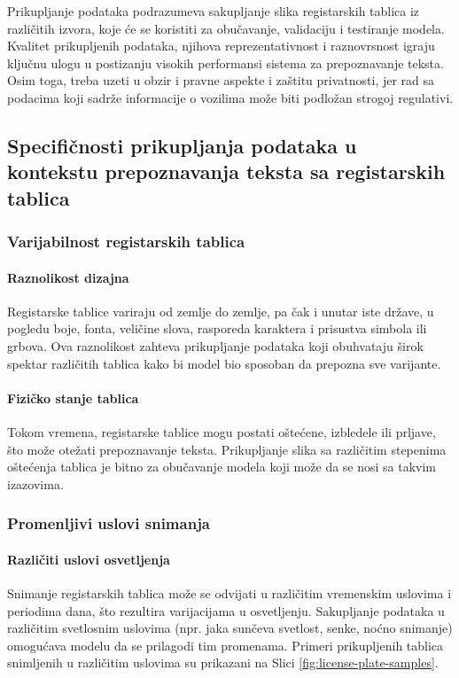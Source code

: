 \documentclass[a4paper,12pt]{article}
\begin{document}
	Prikupljanje podataka podrazumeva sakupljanje slika registarskih tablica iz različitih izvora, koje će se koristiti za obučavanje, validaciju i testiranje modela. Kvalitet prikupljenih podataka, njihova reprezentativnost i raznovrsnost igraju ključnu ulogu u postizanju visokih performansi sistema za prepoznavanje teksta. Osim toga, treba uzeti u obzir i pravne aspekte i zaštitu privatnosti, jer rad sa podacima koji sadrže informacije o vozilima može biti podložan strogoj regulativi.
	
	\subsection{Specifičnosti prikupljanja podataka u kontekstu prepoznavanja teksta sa registarskih tablica}
	
	\subsubsection{Varijabilnost registarskih tablica}
	\paragraph{Raznolikost dizajna}
	Registarske tablice variraju od zemlje do zemlje, pa čak i unutar iste države, u pogledu boje, fonta, veličine slova, rasporeda karaktera i prisustva simbola ili grbova. Ova raznolikost zahteva prikupljanje podataka koji obuhvataju širok spektar različitih tablica kako bi model bio sposoban da prepozna sve varijante.
	
	\paragraph{Fizičko stanje tablica}
	Tokom vremena, registarske tablice mogu postati oštećene, izbledele ili prljave, što može otežati prepoznavanje teksta. Prikupljanje slika sa različitim stepenima oštećenja tablica je bitno za obučavanje modela koji može da se nosi sa takvim izazovima.
	
	\subsubsection{Promenljivi uslovi snimanja}
	\paragraph{Različiti uslovi osvetljenja}
	Snimanje registarskih tablica može se odvijati u različitim vremenskim uslovima i periodima dana, što rezultira varijacijama u osvetljenju. Sakupljanje podataka u različitim svetlosnim uslovima (npr. jaka sunčeva svetlost, senke, noćno snimanje) omogućava modelu da se prilagodi tim promenama. Primeri prikupljenih tablica snimljenih u različitim uslovima su prikazani na Slici \ref{fig:license-plate-samples}.
	
\end{document}
